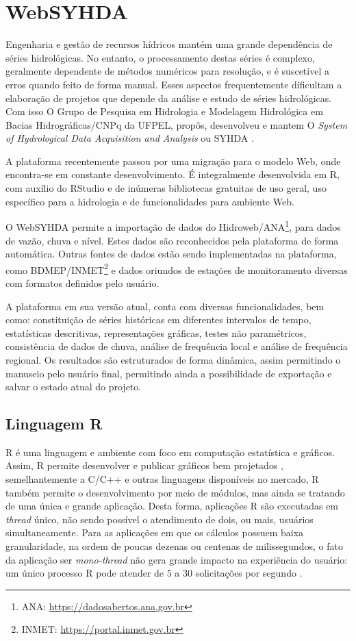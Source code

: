 \documentclass[12pt,english,brazil]{article}
\begin{document}
\section{WebSYHDA}\label{sec:WebSYHDA}

Engenharia e gestão de recursos hídricos mantém uma grande dependência de séries hidrológicas. No entanto, o processamento destas séries é complexo, geralmente dependente de métodos numéricos para resolução, e é suscetível a erros quando feito de forma manual. Esses aspectos frequentemente dificultam a elaboração de projetos que depende da análise e estudo de séries hidrológicas. Com isso O Grupo de Pesquisa em Hidrologia e Modelagem Hidrológica em Bacias Hidrográficas/CNPq da UFPEL, propôs, desenvolveu e mantem O \emph{System of Hydrological Data Acquisition and Analysis} ou SYHDA \cite{syhda}.

A plataforma recentemente passou por uma migração para o modelo Web, onde encontra-se em constante desenvolvimento. É integralmente desenvolvida em R, com auxílio do RStudio e de inúmeras bibliotecas gratuitas de uso geral, uso específico para a hidrologia e de funcionalidades para ambiente Web. %

O WebSYHDA permite a importação de dados do Hidroweb/ANA\footnote{ANA: \url{https://dadosabertos.ana.gov.br}}, para dados de vazão, chuva e nível. Estes dados são reconhecidos pela plataforma de forma automática. Outras fontes de dados estão sendo implementadas na plataforma, como BDMEP/INMET\footnote{INMET: \url{https://portal.inmet.gov.br}} e dados oriundos de estações de monitoramento diversas com formatos definidos pelo usuário.

A plataforma em sua versão atual, conta com diversas funcionalidades, bem como: constituição de séries históricas em diferentes intervalos de tempo, estatísticas descritivas, representações gráficas, testes não paramétricos, consistência de dados de chuva, análise de frequência local e análise de frequência regional. Os resultados são estruturados de forma dinâmica, assim permitindo o manuseio pelo usuário final, permitindo ainda a possibilidade de exportação e salvar o estado atual do projeto. 

\subsection{Linguagem R} \label{sec:R}

R é uma linguagem e ambiente com foco em computação estatística e gráficos. Assim, R permite desenvolver e publicar gráficos bem projetados \cite{whatR}, semelhantemente a C/C++ e outras linguagens disponíveis no mercado, R também permite o desenvolvimento por meio de módulos, mas ainda se tratando de uma única e grande aplicação. Desta forma, aplicações R são executadas em \emph{thread} único, não sendo possível o atendimento de dois, ou mais, usuários simultaneamente. Para as aplicações em que os cálculos possuem baixa granularidade, na ordem de poucas dezenas ou centenas de milissegundos, o fato da aplicação ser \emph{mono-thread} não gera grande impacto na experiência do usuário: um único processo R  pode atender de 5 a 30 solicitações por segundo \cite{ShinyappsEscalabilidade}. 
\end{document}
